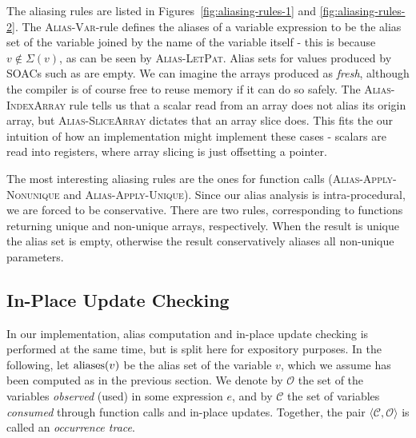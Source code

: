 The aliasing rules are listed in Figures~\ref{fig:aliasing-rules-1}
and \ref{fig:aliasing-rules-2}.  The \textsc{Alias-Var}-rule defines
the aliases of a variable expression to be the alias set of the
variable joined by the name of the variable itself - this is because
$v \notin \Sigma(v)$, as can be seen by \textsc{Alias-LetPat}.  Alias
sets for values produced by SOACs such as  are empty.  We can
imagine the arrays produced as \textit{fresh}, although the compiler
is of course free to reuse memory if it can do so safely.  The
\textsc{Alias-IndexArray} rule tells us that a scalar read from an
array does not alias its origin array, but \textsc{Alias-SliceArray}
dictates that an array slice does.  This fits the our intuition of how
an implementation might implement these cases - scalars are read into
registers, where array slicing is just offsetting a pointer.

The most interesting aliasing rules are the ones for function calls
(\textsc{Alias-Apply-Nonunique} and \textsc{Alias-Apply-Unique}).
Since our alias analysis is intra-procedural, we are forced to be
conservative.  There are two rules, corresponding to functions
returning unique and non-unique arrays, respectively. When the result
is unique the alias set is empty, otherwise the result conservatively
aliases all non-unique parameters.

\subsection{In-Place Update Checking}
\label{sec:update-checking}

\newcommand{\inPlaceSafe}[3]{#1\ \rhd \langle #2, #3 \rangle}
\newcommand{\consumedOK}[3]{#1 \vdash #2 \triangle #3}

In our implementation, alias computation and in-place update checking
is performed at the same time, but is split here for expository
purposes.  In the following, let $\textrm{aliases}(v)$ be the alias set of the
variable $v$, which we assume has been computed as in the previous
section.  We denote by $\mathcal{O}$ the set of the variables
\textit{observed} (used) in some expression $e$, and by $\mathcal{C}$
the set of variables \textit{consumed} through function calls and
in-place updates.  Together, the pair
$\langle\mathcal{C},\mathcal{O}\rangle$ is called an
\textit{occurrence trace}.

